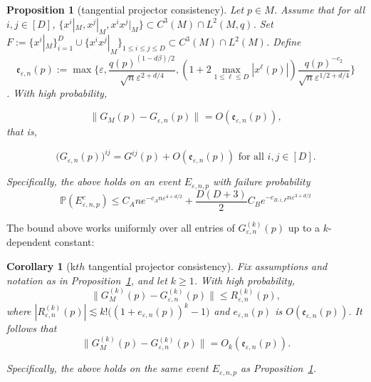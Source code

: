 \documentclass{article}
\newtheorem{proposition}[theorem]{Proposition}
\newtheorem{corollary}[theorem]{Corollary}
\theoremstyle{remark}
\theoremstyle{plain}
\begin{document}
\begin{proposition}[tangential projector consistency]

Let $p \in M$. Assume that for all $i,j \in[D]$, $\{ x^{i}|_{M}, x^{j}|_{M}, x^{i}x^{j} |_{M} \} \subset C^{3}(M) \cap L^{2}(M,q)$. Set $F:=\{ x^{i} |_{M} \}_{i=1}^{D} \cup \{ x^{i}x^{j} |_{M} \}_{1 \leq i \leq j \leq D} \subset C^{3}(M) \cap L^{2}(M)$. Define \[
\mathfrak{e}_{\varepsilon, n}(p):=\max \{  \varepsilon, \frac{q(p)^{(1-d \beta)/2}}{\sqrt{ n } \varepsilon^{2+d/4}}, (1+2\max_{1 \leq \ell \leq D}  |x^{\ell}(p)|) \frac{q(p)^{-c_{2}}}{\sqrt{ n } \varepsilon^{1/2+d/4}}  \}
\]. With high probability,  

\[
\| G_{M}(p) - G_{\varepsilon, n}(p)  \|_{} = O( \mathfrak{e}_{\varepsilon, n}(p) ),
\]
that is, 

$$\big(G_{\varepsilon, n}(p)\big)^{ij}=G ^{ij}(p)+O( \mathfrak{e}_{\varepsilon, n}(p) ) \text{ for all }i,j \in [D] .$$

Specifically, the above holds on an event $E_{\varepsilon, n,p}$ with failure probability $$\mathbb{P}(E_{\varepsilon, n, p}^{c}) \leq C_{A} n e ^{-c_{A}n \varepsilon^{4+d/2}}+ \frac{D(D+3)}{2} C_{B}e^{-c_{B, i, F}n \varepsilon^{3+d/2}}$$
\label{prop:tangential-projector-consistency}
\end{proposition}
The bound above works uniformly over all entries of $G_{\varepsilon, n}^{(k)}(p)$ up to a $k$-dependent constant:

\begin{corollary}[k$th$ tangential projector consistency]
Fix assumptions and notation as in Proposition~\ref{prop:tangential-projector-consistency}, and let \( k \geq 1 \). With high probability,
$$\|G^{(k)}_{M}(p)-G^{(k)}_{\varepsilon, n}(p)\| \leq R^{(k)}_{\varepsilon, n}(p),$$
where $|R^{(k)}_{\varepsilon, n}(p)|\lesssim k!\big( (1+{e}_{\varepsilon, n}(p))^{k}-1\big)^{}$ and $e_{\varepsilon,n}(p)$ is $O(\mathfrak{e}_{\varepsilon,n}(p))$. It follows that $$\|G_{M}^{(k)}(p) - G_{\varepsilon, n}^{(k)}(p)\|=O_{k}(\mathfrak{e}_{\varepsilon, n}(p)).$$

Specifically, the above holds on the same event \( E_{\varepsilon, n ,p} \) as Proposition~\ref{prop:tangential-projector-consistency}. 



\label{cor:kth-tangential-projector-consistency}
\end{corollary}
\end{document}
